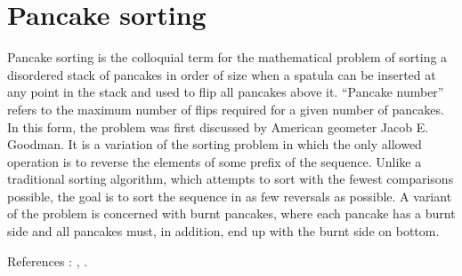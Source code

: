 
\section{Pancake sorting}


Pancake sorting is the colloquial term for the mathematical problem of sorting a disordered stack of pancakes in order of size when a spatula can be inserted at any point in the stack and used to flip all pancakes above it. ``Pancake number'' refers to the maximum number of flips required for a given number of pancakes. In this form, the problem was first discussed by American geometer Jacob E. Goodman. It is a variation of the sorting problem in which the only allowed operation is to reverse the elements of some prefix of the sequence. Unlike a traditional sorting algorithm, which attempts to sort with the fewest comparisons possible, the goal is to sort the sequence in as few reversals as possible. A variant of the problem is concerned with burnt pancakes, where each pancake has a burnt side and all pancakes must, in addition, end up with the burnt side on bottom.


References : \cite{cibulka2011average}, \cite{cohen1995problem}.
